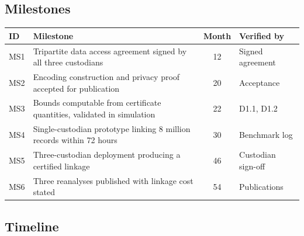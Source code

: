 \subsection{Milestones}

\begin{center}
\small
\begin{tabular}{@{}l L{8.6cm} c l@{}}
  \toprule
  ID & Milestone & Month & Verified by \\
  \midrule
  MS1 & Tripartite data access agreement signed by all three custodians & 12 & Signed agreement \\
  MS2 & Encoding construction and privacy proof accepted for publication & 20 & Acceptance \\
  MS3 & Bounds computable from certificate quantities, validated in simulation & 22 & D1.1, D1.2 \\
  MS4 & Single-custodian prototype linking 8 million records within 72 hours & 30 & Benchmark log \\
  MS5 & Three-custodian deployment producing a certified linkage & 46 & Custodian sign-off \\
  MS6 & Three reanalyses published with linkage cost stated & 54 & Publications \\
  \bottomrule
\end{tabular}
\end{center}

\subsection{Timeline}

